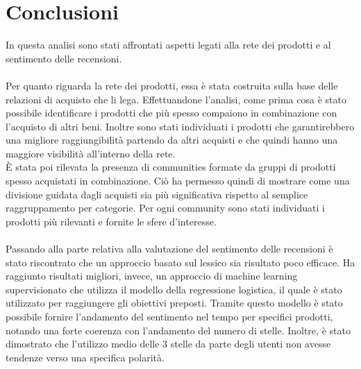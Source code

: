\section{Conclusioni}\label{Conclusioni}
In questa analisi sono stati affrontati aspetti legati alla rete dei prodotti e al sentimento delle recensioni. 
\\\\
Per quanto riguarda la rete dei prodotti, essa è stata costruita sulla base delle relazioni di acquisto che li lega. Effettuandone l'analisi, come prima cosa è stato possibile identificare i prodotti che più spesso compaiono in combinazione con l'acquisto di altri beni. Inoltre sono stati individuati i prodotti che garantirebbero una migliore raggiungibilità partendo da altri acquisti e che quindi hanno una maggiore visibilità all'interno della rete. \\
È stata poi rilevata la presenza di communities formate da gruppi di prodotti spesso acquistati in combinazione. Ciò ha permesso quindi di mostrare come una divisione guidata dagli acquisti sia più significativa rispetto al semplice raggruppamento per categorie. Per ogni community sono stati individuati i prodotti più rilevanti e fornite le sfere d'interesse. 
\\\\
Passando alla parte relativa alla valutazione del sentimento delle recensioni è stato riscontrato che un approccio basato sul lessico sia risultato poco efficace. Ha raggiunto risultati migliori, invece, un approccio di machine learning supervisionato che utilizza il modello della regressione logistica, il quale è stato utilizzato per raggiungere gli obiettivi preposti. Tramite questo modello è stato possibile fornire l'andamento del sentimento nel tempo per specifici prodotti, notando una forte coerenza con l'andamento del numero di stelle. Inoltre, è stato dimostrato che l'utilizzo medio delle 3 stelle da parte degli utenti non avesse tendenze verso una specifica polarità. 
\\\\
